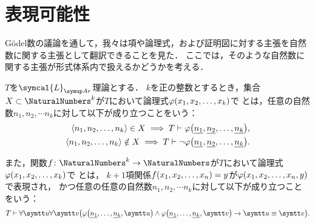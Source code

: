 \section{表現可能性} \label{sec:representation}

Gödel数の議論を通して，我々は項や論理式，および証明図に対する主張を自然数に関する主張として翻訳できることを見た．
ここでは，そのような自然数に関する主張が形式体系内で扱えるかどうかを考える．

\begin{Def} \label{Def:representation}
	\(T\)を\(\symcal{L}_{\Ar}\)理論とする．
	\(k\)を正の整数とするとき，集合\(X \subset \NaturalNumbers^k\)が\(T\)において論理式\(\apply{\varphi}{x_1, x_2, \dots, x_k}\)で
	とは，任意の自然数\(n_1, n_2, \dotsm n_k\)に対して以下が成り立つことをいう：
	\begin{align}
		\pair{n_1, n_2, \dots, n_k} \in X \metaimplies T \provable \apply{\varphi}{\numeral{n_1}, \numeral{n_2}, \dots, \numeral{n_k}},
		\label{eq:representationtrue} \\
		\pair{n_1, n_2, \dots, n_k} \notin X \metaimplies T \provable \lnot \apply{\varphi}{\numeral{n_1}, \numeral{n_2}, \dots, \numeral{n_k}}.
		\label{eq:representationfalse}
	\end{align}

	また，関数\(f \colon \NaturalNumbers^k \to \NaturalNumbers\)が\(T\)において論理式\(\apply{\varphi}{x_1, x_2, \dots, x_k}\)で
	とは，
	\(k + 1\)項関係\(\apply{f}{x_1, x_2, \dots, x_n} = y\)が\(\apply{\varphi}{x_1, x_2, \dots, x_n, y}\)で表現され，
	かつ任意の任意の自然数\(n_1, n_2, \dotsm n_k\)に対して以下が成り立つことをいう：
	\begin{equation}
		T \provable \forall \obj{u} \forall \obj{v} \paren{
			\apply{\varphi}{\numeral{n_1}, \dots, \numeral{n_k}, \obj{u}}
			\land \apply{\varphi}{\numeral{n_1}, \dots, \numeral{n_k}, \obj{v}}
			\to \obj{u} \objeq \obj{v}
		}.
		\label{eq:representationfunction}
	\end{equation}
\end{Def}

